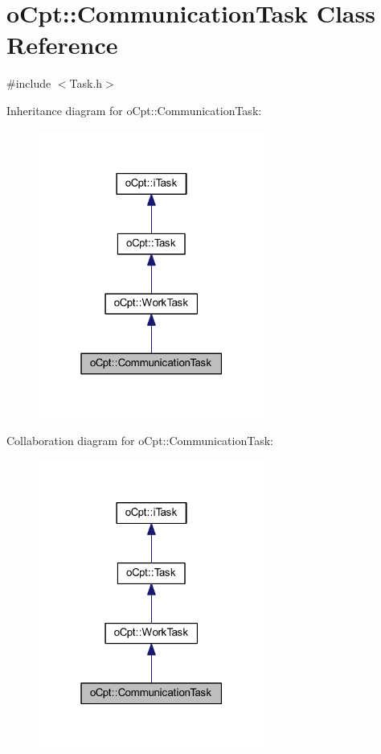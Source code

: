 \hypertarget{classo_cpt_1_1_communication_task}{}\section{o\+Cpt\+:\+:Communication\+Task Class Reference}
\label{classo_cpt_1_1_communication_task}


{\ttfamily \#include $<$Task.\+h$>$}



Inheritance diagram for o\+Cpt\+:\+:Communication\+Task\+:
\nopagebreak
\begin{figure}[H]
\begin{center}
\leavevmode
\includegraphics[width=211pt]{classo_cpt_1_1_communication_task__inherit__graph}
\end{center}
\end{figure}


Collaboration diagram for o\+Cpt\+:\+:Communication\+Task\+:
\nopagebreak
\begin{figure}[H]
\begin{center}
\leavevmode
\includegraphics[width=211pt]{classo_cpt_1_1_communication_task__coll__graph}
\end{center}
\end{figure}
